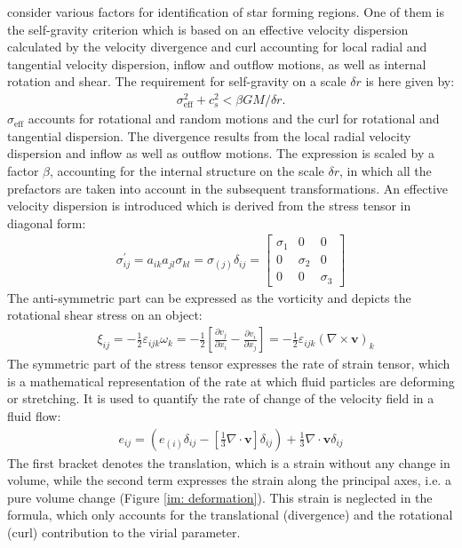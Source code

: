 \documentclass{aa}
\begin{document}
\cite{Hopkins_2013} consider various factors for identification of star forming regions. One of them is the self-gravity criterion which is based on an effective velocity dispersion calculated by the velocity divergence and curl accounting for local radial and tangential velocity dispersion, inflow and outflow motions, as well as internal rotation and shear. 
The requirement for self-gravity on a scale $\delta r$ is here given by:
\begin{align}
    \sigma_{\mathrm{eff}}^2+c_s^2 < \beta G M / \delta r.
\end{align}
$\sigma_{\mathrm{eff}}$ accounts for rotational and random motions and the curl for rotational and tangential dispersion. The divergence results from the local radial velocity dispersion and inflow as well as outflow motions. The expression is scaled by a factor $\beta$, accounting for the internal structure on the scale $\delta r$, in which all the prefactors are taken into account in the subsequent transformations.
An effective velocity dispersion is introduced which is derived from the stress tensor in diagonal form:
\begin{align}
    \sigma_{i j}^{\prime}=a_{i k} a_{j l} \sigma_{k l}=\sigma_{(j)} \delta_{i j}=\left[\begin{array}{ccc}
\sigma_1 & 0 & 0 \\
0 & \sigma_2 & 0 \\
0 & 0 & \sigma_3
\end{array}\right]
\end{align}
The anti-symmetric part can be expressed as the vorticity and depicts the rotational shear stress on an object:
\begin{align}
&\xi_{i j}=-\frac{1}{2} \varepsilon_{i j k} \omega_k=-\frac{1}{2}\left[\frac{\partial v_j}{\partial x_i}-\frac{\partial v_i}{\partial x_j}\right]=-\frac{1}{2} \varepsilon_{i j k} (\nabla \times \textbf{v})_k
\end{align}
The symmetric part of the stress tensor expresses the rate of strain tensor, which is a mathematical representation of the rate at which fluid particles are deforming or stretching. It is used to quantify the rate of change of the velocity field in a fluid flow:
\begin{align}
e_{i j}=\left(e_{(i)} \delta_{i j}-\left[\frac{1}{3} \nabla \cdot \textbf{v}\right] \delta_{i j}\right)+\frac{1}{3}\nabla \cdot \textbf{v} \delta_{i j} 
\end{align}
The first bracket denotes the translation, which is a strain without any change in volume, while the second term expresses the strain along the principal axes, i.e. a pure volume change (Figure \ref{im: deformation}). This strain is neglected in the \cite{Hopkins_2013} formula, which only accounts for the translational (divergence) and the rotational (curl) contribution to the virial parameter. 
\end{document}
